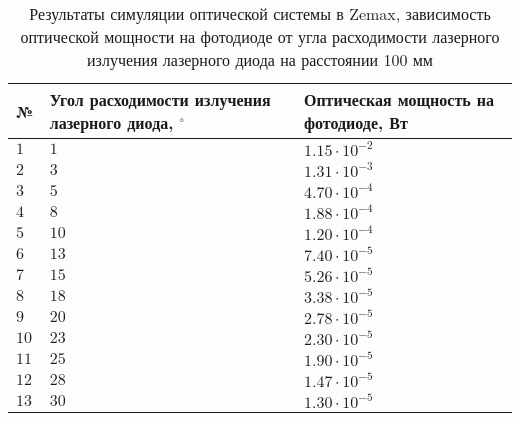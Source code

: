 \begin{table}
    \caption{Результаты симуляции оптической системы в Zemax, зависимость оптической мощности на фотодиоде от угла расходимости лазерного излучения лазерного диода на расстоянии 100 мм}
    \label{tab:divergence_simulation}
    \begin{tabularx}{\textwidth} {
        | l
        | >{\centering\arraybackslash}X
        | >{\centering\arraybackslash}X | }
        \hline
            № & Угол расходимости излучения лазерного диода, ${}^\circ$ & Оптическая мощность на фотодиоде, Вт \\ \hline
            $1$ & $1$ & $1.15 \cdot 10^{-2}$ \\ \hline
            $2$ & $3$ & $1.31 \cdot 10^{-3}$ \\ \hline
            $3$ & $5$ & $4.70 \cdot 10^{-4}$ \\ \hline
            $4$ & $8$ & $1.88 \cdot 10^{-4}$ \\ \hline
            $5$ & $10$ & $1.20 \cdot 10^{-4}$ \\ \hline
            $6$ & $13$ & $7.40 \cdot 10^{-5}$ \\ \hline
            $7$ & $15$ & $5.26 \cdot 10^{-5}$ \\ \hline
            $8$ & $18$ & $3.38 \cdot 10^{-5}$ \\ \hline
            $9$ & $20$ & $2.78 \cdot 10^{-5}$ \\ \hline
            $10$ & $23$ & $2.30 \cdot 10^{-5}$ \\ \hline
            $11$ & $25$ & $1.90 \cdot 10^{-5}$ \\ \hline
            $12$ & $28$ & $1.47 \cdot 10^{-5}$ \\ \hline
            $13$ & $30$ & $1.30 \cdot 10^{-5}$ \\ \hline                 
    \end{tabularx}
\end{table}

